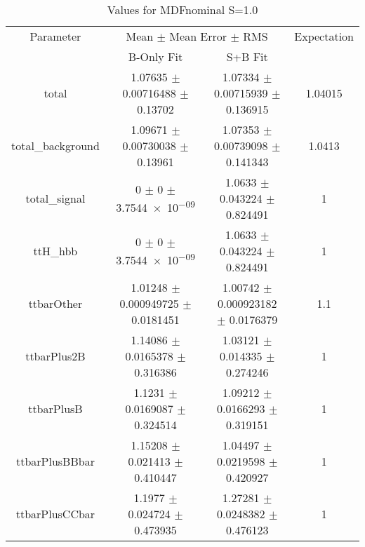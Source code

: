 \begin{table}
\centering
\caption{Values for MDFnominal S=1.0}
\begin{tabular}{cccc}
\toprule
Parameter & \multicolumn{2}{c}{Mean $\pm$ Mean Error $\pm$ RMS} & Expectation\\
 & B-Only Fit & S+B Fit & \\
\midrule
total & \num{1.07635} $\pm$ \num{0.00716488} $\pm$ \num{0.13702} & \num{1.07334} $\pm$ \num{0.00715939} $\pm$ \num{0.136915} & \num{1.04015}\\
total\_background & \num{1.09671} $\pm$ \num{0.00730038} $\pm$ \num{0.13961} & \num{1.07353} $\pm$ \num{0.00739098} $\pm$ \num{0.141343} & \num{1.0413}\\
total\_signal & \num{0} $\pm$ \num{0} $\pm$ \num{3.7544e-09} & \num{1.0633} $\pm$ \num{0.043224} $\pm$ \num{0.824491} & \num{1}\\
ttH\_hbb & \num{0} $\pm$ \num{0} $\pm$ \num{3.7544e-09} & \num{1.0633} $\pm$ \num{0.043224} $\pm$ \num{0.824491} & \num{1}\\
ttbarOther & \num{1.01248} $\pm$ \num{0.000949725} $\pm$ \num{0.0181451} & \num{1.00742} $\pm$ \num{0.000923182} $\pm$ \num{0.0176379} & \num{1.1}\\
ttbarPlus2B & \num{1.14086} $\pm$ \num{0.0165378} $\pm$ \num{0.316386} & \num{1.03121} $\pm$ \num{0.014335} $\pm$ \num{0.274246} & \num{1}\\
ttbarPlusB & \num{1.1231} $\pm$ \num{0.0169087} $\pm$ \num{0.324514} & \num{1.09212} $\pm$ \num{0.0166293} $\pm$ \num{0.319151} & \num{1}\\
ttbarPlusBBbar & \num{1.15208} $\pm$ \num{0.021413} $\pm$ \num{0.410447} & \num{1.04497} $\pm$ \num{0.0219598} $\pm$ \num{0.420927} & \num{1}\\
ttbarPlusCCbar & \num{1.1977} $\pm$ \num{0.024724} $\pm$ \num{0.473935} & \num{1.27281} $\pm$ \num{0.0248382} $\pm$ \num{0.476123} & \num{1}\\
\bottomrule
\end{tabular}
\end{table}